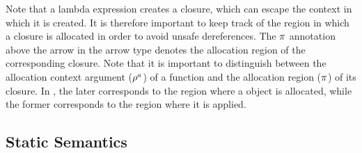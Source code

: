 Note that a lambda expression creates a closure, which can escape the
context in which it is created. It is therefore important to keep track of
the region in which a closure is allocated in order to avoid unsafe
dereferences. The $\pi$ annotation above the arrow in the arrow
type denotes the allocation region of the corresponding closure. Note
that it is important to distinguish between the allocation context
argument ($\rho^a$) of a function and the allocation region
($\pi$) of its closure. In \name, the later corresponds to the region where
a  object is allocated, while the former corresponds to the
region where it is applied. 

\subsection{Static Semantics}
